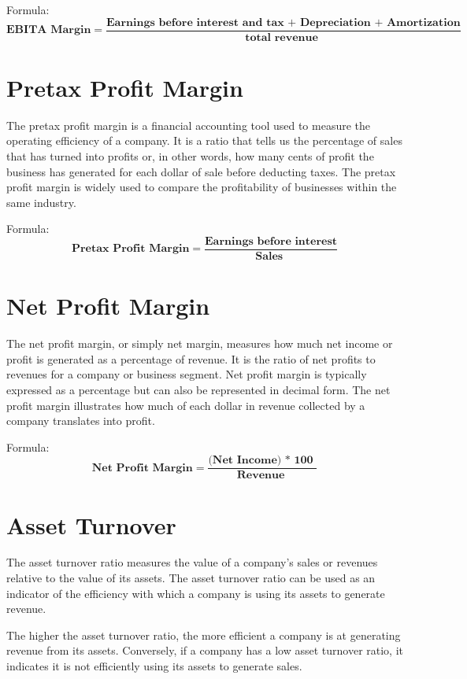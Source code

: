 \documentclass{article}
\begin{document}
Formula:
$$
\textbf{EBITA Margin} =  \frac{\textbf{Earnings before interest and tax + Depreciation + Amortization}}{\textbf{total revenue }}
$$

\section{Pretax Profit Margin}
\label{sec:ppm}
The pretax profit margin is a financial accounting tool used to measure the operating efficiency of a company. It is a ratio that tells us the percentage of sales that has turned into profits or, in other words, how many cents of profit the business has generated for each dollar of sale before deducting taxes. The pretax profit margin is widely used to compare the profitability of businesses within the same industry. 
\par
\bigskip

Formula:
$$
\textbf{Pretax Profit Margin} =  \frac{\textbf{Earnings before interest}}{\textbf{Sales }}
$$

\section{Net Profit Margin}
\label{sec:npm}
The net profit margin, or simply net margin, measures how much net income or profit is generated as a percentage of revenue. It is the ratio of net profits to revenues for a company or business segment. Net profit margin is typically expressed as a percentage but can also be represented in decimal form. The net profit margin illustrates how much of each dollar in revenue collected by a company translates into profit. 
\par
\bigskip

Formula:
$$
\textbf{Net Profit Margin} =  \frac{\textbf{(Net Income) * 100 }}{\textbf{Revenue }}
$$

\section{Asset Turnover}
\label{sec:at}
 The asset turnover ratio measures the value of a company's sales or revenues relative to the value of its assets. The asset turnover ratio can be used as an indicator of the efficiency with which a company is using its assets to generate revenue.
\par
\bigskip
The higher the asset turnover ratio, the more efficient a company is at generating revenue from its assets. Conversely, if a company has a low asset turnover ratio, it indicates it is not efficiently using its assets to generate sales. 
\par
\bigskip
\end{document}
